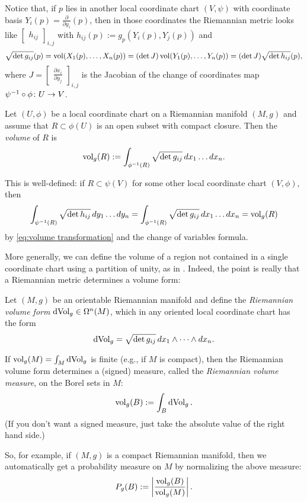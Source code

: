 Notice that, if $p$ lies in another local coordinate chart $(V,\psi)$ with coordinate basis $Y_i(p) = \frac{\partial}{\partial y_i}(p)$, then in those coordinates the Riemannian metric looks like $\begin{bmatrix} h_{ij} \end{bmatrix}_{i,j}$ with $h_{ij}(p) := g_p(Y_i(p), Y_j(p))$ and
\begin{equation}\label{eq:volume transformation}
	\sqrt{\det g_{ij}}(p) = \operatorname{vol}(X_1(p), \dots , X_n(p)) = (\det J) \operatorname{vol}(Y_1(p), \dots , Y_n(p)) = (\det J) \sqrt{\det h_{ij}}(p),
\end{equation}
where $J = \begin{bmatrix} \frac{\partial x_i}{\partial y_j}\end{bmatrix}_{i,j}$ is the Jacobian of the change of coordinates map $\psi^{-1} \circ \phi \colon\thinspace\! U \to V$.

\begin{definition}\label{def:Riemannian volume}
	Let $(U,\phi)$ be a local coordinate chart on a Riemannian manifold $(M,g)$ and assume that $R \subset \phi(U)$ is an open subset with compact closure. Then the \emph{volume} of $R$ is
	\[
		\operatorname{vol}_g(R) := \int_{\phi^{-1}(R)} \sqrt{\det g_{ij}}\, dx_1 \dots dx_n.
	\]
\end{definition}

This is well-defined: if $R \subset \psi(V)$ for some other local coordinate chart $(V,\phi)$, then
\[
	\int_{\psi^{-1}(R)} \sqrt{\det h_{ij}}\, dy_1 \dots dy_n = \int_{\phi^{-1}(R)} \sqrt{\det g_{ij}}\, dx_1 \dots dx_n = \operatorname{vol}_g(R)
\]
by \eqref{eq:volume transformation} and the change of variables formula.

More generally, we can define the volume of a region not contained in a single coordinate chart using a partition of unity, as in . Indeed, the point is really that a Riemannian metric determines a volume form:

\begin{definition}\label{def:Riemannian volume form}
	Let $(M,g)$ be an orientable Riemannian manifold and define the \emph{Riemannian volume form} $\operatorname{dVol}_g \in \Omega^n(M)$, which in any oriented local coordinate chart has the form
	\[
		\operatorname{dVol}_g = \sqrt{\det g_{ij}}\, dx_1 \wedge \dots \wedge dx_n.
	\]
\end{definition}

If $\operatorname{vol}_g(M) = \int_M \operatorname{dVol}_g$ is finite (e.g., if $M$ is compact), then the Riemannian volume form determines a (signed) measure, called the \emph{Riemannian volume measure}, on the Borel sets in $M$:
\[
	\operatorname{vol}_g(B) := \int_B \operatorname{dVol}_g.
\]
(If you don't want a signed measure, just take the absolute value of the right hand side.)

So, for example, if $(M,g)$ is a compact Riemannian manifold, then we automatically get a probability measure on $M$ by normalizing the above measure:
\[
	P_g(B) := \left|\frac{\operatorname{vol}_g(B)}{\operatorname{vol}_g(M)}\right|.
\]